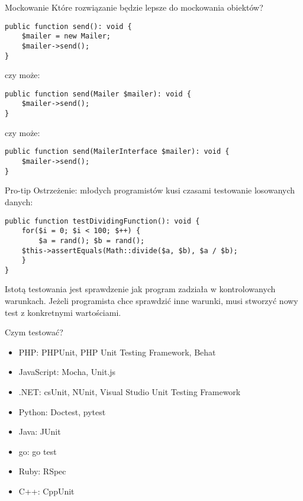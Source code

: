 \begin{frame}[fragile]{Mockowanie}	
	Które rozwiązanie będzie lepsze do mockowania obiektów?
\begin{lstlisting}
public function send(): void {
    $mailer = new Mailer;
    $mailer->send();
}
\end{lstlisting}

	czy może:

\begin{lstlisting}
public function send(Mailer $mailer): void {
    $mailer->send();
}
\end{lstlisting}

	czy może:

\begin{lstlisting}
public function send(MailerInterface $mailer): void {
    $mailer->send();
}
\end{lstlisting}
\end{frame}

\begin{frame}[fragile]{Pro-tip}
	Ostrzeżenie: młodych programistów kusi czasami testowanie losowanych danych:
	
\begin{lstlisting}
public function testDividingFunction(): void {
    for($i = 0; $i < 100; $++) {
        $a = rand(); $b = rand();
	$this->assertEquals(Math::divide($a, $b), $a / $b);
    }
}
\end{lstlisting}

	Istotą testowania jest sprawdzenie jak program zadziała w kontrolowanych warunkach. Jeżeli programista chce sprawdzić inne warunki, musi stworzyć nowy test z konkretnymi wartościami.

\end{frame}

\begin{frame}{Czym testować?}
	\begin{itemize}
	\item PHP: PHPUnit, PHP Unit Testing Framework, Behat
	\item JavaScript: Mocha, Unit.js
	\item .NET: csUnit, NUnit, Visual Studio Unit Testing Framework
	\item Python: Doctest, pytest
	\item Java: JUnit
	\item go: go test
	\item Ruby: RSpec
	\item C++: CppUnit
	\end{itemize}
\end{frame}
	
